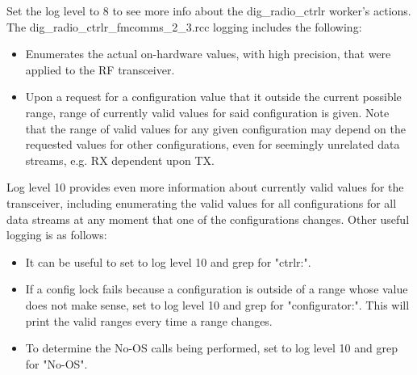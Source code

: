 \documentclass{article}
\def\comp{dig\_radio\_ctrlr\_fmcomms\_2\_3}
\begin{document}
  Set the log level to 8 to see more info about the dig\_radio\_ctrlr worker's
  actions.
  The \comp.rcc logging includes the following:
  \begin{itemize}
    \item Enumerates the actual on-hardware values, with high
      precision,
      that were applied to the RF
      transceiver.
    \item Upon a request for a configuration value that it outside the current
      possible range, range of currently valid values for said configuration
      is given. Note that the range of valid values for any given
      configuration
      may depend on the requested values for other configurations, even
      for seemingly unrelated data streams, e.g. RX dependent upon TX.
  \end{itemize}
  Log level 10 provides even more information about currently
  valid
  values for the transceiver, including enumerating the valid values for all
  configurations for all data streams at any moment that one of the
  configurations changes. Other useful logging is as follows:
  \begin{itemize}
    \item It can be useful to set to log level 10 and grep for "ctrlr:".
    \item If a config lock fails because a configuration is outside of a range
      whose value does not make sense,
      set to log level 10 and grep for "configurator:". This will print the
      valid ranges every time a range changes.
    \item To determine the No-OS calls being performed, set to log level 10
      and grep for "No-OS".
  \end{itemize}
\end{document}
